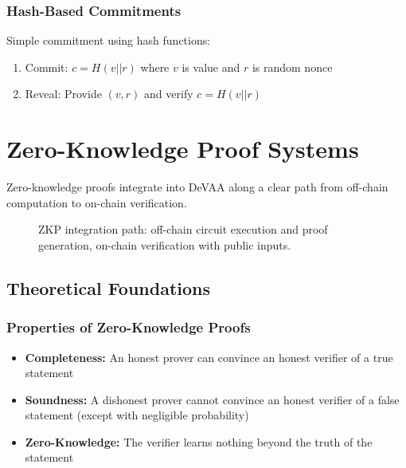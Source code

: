 \subsubsection{Hash-Based Commitments}
Simple commitment using hash functions:
\begin{enumerate}
    \item Commit: $c = H(v || r)$ where $v$ is value and $r$ is random nonce
    \item Reveal: Provide $(v, r)$ and verify $c = H(v || r)$
\end{enumerate}

\section{Zero-Knowledge Proof Systems}

Zero-knowledge proofs integrate into DeVAA along a clear path from off-chain computation to on-chain verification.

\begin{figure}[h]
    \centering
    \caption{ZKP integration path: off-chain circuit execution and proof generation, on-chain verification with public inputs.}
    \label{fig:zkp-integration}
\end{figure}

\subsection{Theoretical Foundations}

\subsubsection{Properties of Zero-Knowledge Proofs}
\begin{itemize}
    \item \textbf{Completeness:} An honest prover can convince an honest verifier of a true statement
    \item \textbf{Soundness:} A dishonest prover cannot convince an honest verifier of a false statement (except with negligible probability)
    \item \textbf{Zero-Knowledge:} The verifier learns nothing beyond the truth of the statement
\end{itemize}

